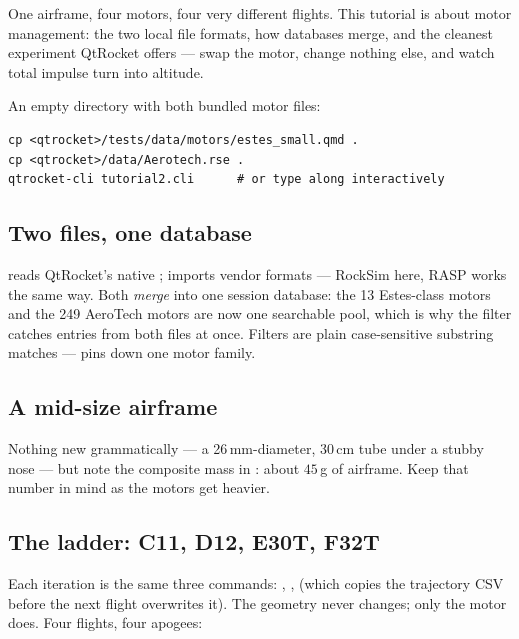 One airframe, four motors, four very different flights. This tutorial is about
motor management: the two local file formats, how databases merge, and the
cleanest experiment QtRocket offers --- swap the motor, change nothing else,
and watch total impulse turn into altitude.

\begin{note}[Setup]
An empty directory with both bundled motor files:
\begin{verbatim}
cp <qtrocket>/tests/data/motors/estes_small.qmd .
cp <qtrocket>/data/Aerotech.rse .
qtrocket-cli tutorial2.cli      # or type along interactively
\end{verbatim}
\end{note}

\subsection*{Two files, one database}



 reads QtRocket's native ;  imports
vendor formats --- RockSim  here, RASP  works the same
way. Both \emph{merge} into one session database: the 13 Estes-class motors
and the 249 AeroTech motors are now one searchable pool, which is why the
 filter catches entries from both files at once. Filters are plain
case-sensitive substring matches ---  pins down one motor family.

\subsection*{A mid-size airframe}



Nothing new grammatically --- a 26\,mm-diameter, 30\,cm tube under a stubby
nose --- but note the composite mass in : about
$45$\,g of airframe. Keep that number in mind as the motors get heavier.

\subsection*{The ladder: C11, D12, E30T, F32T}



Each iteration is the same three commands: , ,
 (which copies the trajectory CSV before the next flight overwrites
it). The geometry never changes; only the motor does. Four flights,
four apogees:


